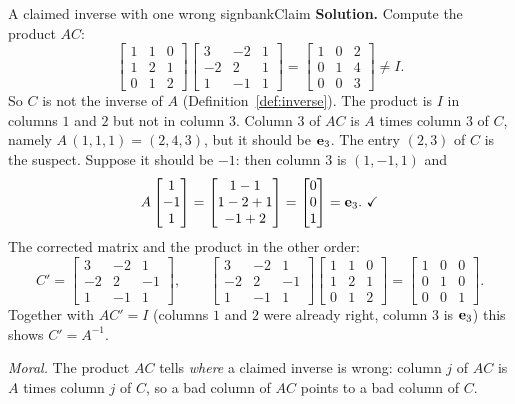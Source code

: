 \documentclass[11pt]{article}
\begin{document}
\begin{exmp}{A claimed inverse with one wrong sign}{bankClaim}
\textbf{Solution.} Compute the product $AC$:
\[
\begin{bmatrix}1&1&0\\1&2&1\\0&1&2\end{bmatrix}\begin{bmatrix}3&-2&1\\-2&2&1\\1&-1&1\end{bmatrix}=\begin{bmatrix}1&0&2\\0&1&4\\0&0&3\end{bmatrix}\neq I .
\]
So $C$ is not the inverse of $A$ (Definition~\ref{def:inverse}). The product is $I$ in columns $1$ and $2$ but not in column $3$. Column $3$ of $AC$ is $A$ times column $3$ of $C$, namely $A\,(1,1,1)=(2,4,3)$, but it should be $\mathbf{e}_3$. The entry $(2,3)$ of $C$ is the suspect. Suppose it should be $-1$: then column $3$ is $(1,-1,1)$ and
\[
A\begin{bmatrix}1\\-1\\1\end{bmatrix}=\begin{bmatrix}1-1\\1-2+1\\-1+2\end{bmatrix}=\begin{bmatrix}0\\0\\1\end{bmatrix}=\bv{e}_3.\ \checkmark
\]
The corrected matrix and the product in the other order:
\[
C'=\begin{bmatrix}3&-2&1\\-2&2&-1\\1&-1&1\end{bmatrix},\qquad
\begin{bmatrix}3&-2&1\\-2&2&-1\\1&-1&1\end{bmatrix}\begin{bmatrix}1&1&0\\1&2&1\\0&1&2\end{bmatrix}=\begin{bmatrix}1&0&0\\0&1&0\\0&0&1\end{bmatrix}.
\]
Together with $AC'=I$ (columns $1$ and $2$ were already right, column $3$ is $\mathbf{e}_3$) this shows $C'=A^{-1}$.

\emph{Moral.} The product $AC$ tells \emph{where} a claimed inverse is wrong: column $j$ of $AC$ is $A$ times column $j$ of $C$, so a bad column of $AC$ points to a bad column of $C$.
\end{exmp}
\end{document}
